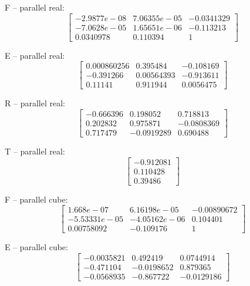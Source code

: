 \documentclass[10pt,a4paper]{article}
\begin{document}
F -- parallel real: 
\begin{equation*}
\begin{bmatrix}
-2.9877e-08 & 7.06355e-05 & -0.0341329 \\ -7.0628e-05 & 1.65651e-06 & -0.113213 \\ 0.0340978 & 0.110394 & 1
\end{bmatrix}
\end{equation*}

E -- parallel real: 
\begin{equation*}
\begin{bmatrix}
0.000860256 & 0.395484 & -0.108169 \\ -0.391266 & 0.00564393 & -0.913611 \\ 0.11141 & 0.911944 & 0.0056475
\end{bmatrix}
\end{equation*}

R -- parallel real: 
\begin{equation*}
\begin{bmatrix}
-0.666396 & 0.198052 & 0.718813 \\ 0.202832 & 0.975871 & -0.0808369 \\ 0.717479 & -0.0919289 & 0.690488
\end{bmatrix}
\end{equation*}

T -- parallel real: 
\begin{equation*}
\begin{bmatrix}
-0.912081 \\ 0.110428 \\ 0.39486
\end{bmatrix}
\end{equation*}

F -- parallel cube: 
\begin{equation*}
\begin{bmatrix}
1.668e-07 & 6.16198e-05 & -0.00890672 \\ -5.53331e-05 & -4.05162e-06 & 0.104401 \\ 0.00758092 & -0.109176 & 1
\end{bmatrix}
\end{equation*}

E -- parallel cube: 
\begin{equation*}
\begin{bmatrix}
-0.0035821 & 0.492419 & 0.0744914 \\ -0.471104 & -0.0198652 & 0.879365 \\ -0.0568935 & -0.867722 & -0.0129186
\end{bmatrix}
\end{equation*}
\end{document}
